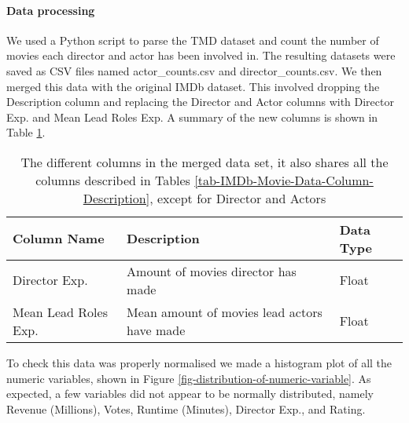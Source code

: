     \paragraph{Data processing}
        We used a Python script to parse the TMD dataset and count the number of
            movies each director and actor has been involved in.
        The resulting datasets were saved as CSV files named actor\_counts.csv and
            director\_counts.csv.
        We then merged this data with the original IMDb
            dataset.
        This involved dropping the Description column and replacing the
            Director and Actor columns with Director Exp. and Mean Lead Roles Exp.
        A summary of the new columns is shown in Table
            \ref*{tab-merged-data-column-description}.
        \begin{table}[H]
            \centering
            \begin{tabular}{lp{9cm}l}
                \toprule
                Column Name          & Description                                                  & Data Type \\
                \midrule
                Director Exp.        & Amount of movies director has made & Float     \\
                Mean Lead Roles Exp. & Mean amount of movies lead actors have made & Float     \\
                \bottomrule
            \end{tabular}
            \caption[short]{The different columns in the merged data set, 
                            it also shares all the columns described in Tables
                            \ref*{tab-IMDb-Movie-Data-Column-Description}, 
                            except for Director and Actors}\label{tab-merged-data-column-description}
        \end{table}
        To check this data was properly normalised we made a histogram plot of all the
            numeric variables, shown in Figure \ref{fig-distribution-of-numeric-variable}.
        As expected, a few variables did not appear to be normally distributed, namely
        Revenue (Millions), Votes, Runtime (Minutes), Director Exp., and Rating.
